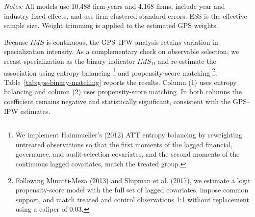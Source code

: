 \documentclass[11pt]{article}
\begin{document}
\begin{table}[H]
    \centering
    \caption{GPS--IPW Weight-Trimming Sensitivity}
    \label{tab:gps-ipw-sensitivity}
    \par\smallskip
    \begin{minipage}{0.95\textwidth}
        \footnotesize
        \textit{Notes:} All models use 10,488 firm-years and 4,168 firms, include year and industry fixed effects, and use firm-clustered standard errors. ESS is the effective sample size. Weight trimming is applied to the estimated GPS weights.
    \end{minipage}
\end{table}

Because \(IMS\) is continuous, the GPS--IPW analysis retains variation in specialization intensity. 
As a complementary check on observable selection, we recast specialization as the binary indicator \(IMS_D\) and re-estimate the association using entropy balancing \citep{hainmueller2012}
\footnote{We implement Hainmueller's (2012) ATT entropy balancing by reweighting untreated observations so that the first moments of the lagged financial, governance, and audit-selection covariates, and the second moments of the continuous lagged covariates, match the treated group.} and propensity-score matching \citep{minuttimeza2013,shipman2017psm}\footnote{Following Minutti-Meza (2013) and Shipman et al. (2017), we estimate a logit propensity-score model with the full set of lagged covariates, impose common support, and match treated and control observations 1:1 without replacement using a caliper of 0.03.}.
Table~\ref{tab:gps-binary-matching} reports the results. Column (1) uses entropy balancing and column (2) uses propensity-score matching. In both columns the coefficient remains negative and statistically significant, consistent with the GPS--IPW estimates.


\end{document}
